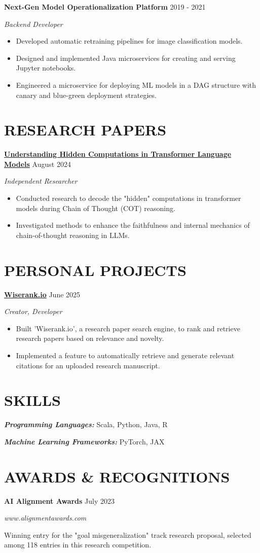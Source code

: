 \documentclass[fontsize=11pt]{article}
\newcommand{\sepspace}{\vspace*{1em}}
\newcommand{\NewPart}[1]{\section*{\uppercase{#1}}}
\newcommand{\SkillsEntry}[2]{
    \noindent\textbf{\textit{#1}} \hspace{1.5em} #2 \par}
\newcommand{\ProjectEntry}[4]{
    \noindent \textbf{#1} \hfill {#2} \par
    \noindent \textit{#3} \par
    \noindent \small #4
    \normalsize \par}
\newcommand{\AwardEntry}[4]{
    \noindent \textbf{#1} \hfill {#2} \par
    \noindent \textit{#3} \par
    \noindent \small #4
    \normalsize \par}
\begin{document}
\sepspace
\ProjectEntry{Next-Gen Model Operationalization Platform}{2019 - 2021}{Backend Developer}
{%
\begin{itemize}
\item Developed automatic retraining pipelines for image classification models.
\item Designed and implemented Java microservices for creating and serving Jupyter notebooks.
\item Engineered a microservice for deploying ML models in a DAG structure with canary and blue-green deployment strategies.
\end{itemize}}

\NewPart{RESEARCH PAPERS}

\ProjectEntry{\href{https://arxiv.org/html/2412.04537}{Understanding Hidden Computations in Transformer Language Models}}{August 2024}{Independent Researcher}
{%
\begin{itemize}
\item Conducted research to decode the "hidden" computations in transformer models during Chain of Thought (COT) reasoning.
\item Investigated methods to enhance the faithfulness and internal mechanics of chain-of-thought reasoning in LLMs.
\end{itemize}}


\NewPart{PERSONAL PROJECTS}
\ProjectEntry{\href{https://wiserank.io}{Wiserank.io}}{June 2025}{Creator, Developer}
{%
\begin{itemize}
\item Built 'Wiserank.io', a research paper search engine, to rank and retrieve research papers based on relevance and novelty.
\item Implemented a feature to automatically retrieve and generate relevant citations for an uploaded research manuscript.
\end{itemize}}

\NewPart{SKILLS}
\SkillsEntry{Programming Languages:}{Scala, Python, Java, R}
\SkillsEntry{Machine Learning Frameworks:}{PyTorch, JAX}

\NewPart{AWARDS \& RECOGNITIONS}

\AwardEntry{AI Alignment Awards}{July 2023}{www.alignmentawards.com}
{Winning entry for the "goal misgeneralization" track research proposal, selected among 118 entries in this research competition.}

\sepspace
\end{document}
